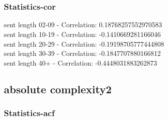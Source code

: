 \documentclass{article}%
\begin{document}
\begin{figure}[ht]%
\centering%
\setlength{\abovecaptionskip}{-35pt}%
%
%
\\%
%
%
\\%
%
\end{figure}

%
\newpage%
\subsubsection{Statistics{-}cor}%
\label{ssubsec:Statistics{-}cor}%
\noindent%
sent length 02-09 - Correlation: 0.18768257552970583\\%
sent length 10-19 - Correlation: -0.1410669281166046\\%
sent length 20-29 - Correlation: -0.19198705777444808\\%
sent length 30-39 - Correlation: -0.1847707880166812\\%
sent length 40+ - Correlation: -0.4448031883262873\\

%
\newpage

%
\subsection{absolute complexity2}%
\label{subsec:absolutecomplexity2}%
\subsubsection{Statistics{-}acf}%
\label{ssubsec:Statistics{-}acf}%
\end{document}
